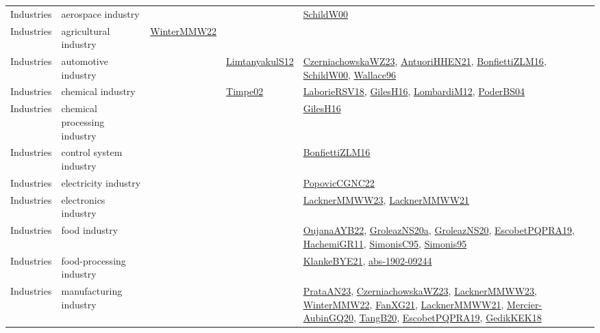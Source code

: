 {\begin{longtable}{lp{3cm}>{\raggedright}p{6cm}>{\raggedright}p{6cm}p{8cm}}
Industries & aerospace industry &  &  & \href{articles/SchildW00.pdf}{SchildW00}\cite{SchildW00}\\
Industries & agricultural industry & \href{papers/WinterMMW22.pdf}{WinterMMW22}\cite{WinterMMW22} &  & \\
Industries & automotive industry &  & \href{articles/LimtanyakulS12.pdf}{LimtanyakulS12}\cite{LimtanyakulS12} & \href{articles/CzerniachowskaWZ23.pdf}{CzerniachowskaWZ23}\cite{CzerniachowskaWZ23}, \href{papers/AntuoriHHEN21.pdf}{AntuoriHHEN21}\cite{AntuoriHHEN21}, \href{papers/BonfiettiZLM16.pdf}{BonfiettiZLM16}\cite{BonfiettiZLM16}, \href{articles/SchildW00.pdf}{SchildW00}\cite{SchildW00}, \href{articles/Wallace96.pdf}{Wallace96}\cite{Wallace96}\\
Industries & chemical industry &  & \href{articles/Timpe02.pdf}{Timpe02}\cite{Timpe02} & \href{articles/LaborieRSV18.pdf}{LaborieRSV18}\cite{LaborieRSV18}, \href{papers/GilesH16.pdf}{GilesH16}\cite{GilesH16}, \href{articles/LombardiM12.pdf}{LombardiM12}\cite{LombardiM12}, \href{articles/PoderBS04.pdf}{PoderBS04}\cite{PoderBS04}\\
Industries & chemical processing industry &  &  & \href{papers/GilesH16.pdf}{GilesH16}\cite{GilesH16}\\
Industries & control system industry &  &  & \href{papers/BonfiettiZLM16.pdf}{BonfiettiZLM16}\cite{BonfiettiZLM16}\\
Industries & electricity industry &  &  & \href{papers/PopovicCGNC22.pdf}{PopovicCGNC22}\cite{PopovicCGNC22}\\
Industries & electronics industry &  &  & \href{articles/LacknerMMWW23.pdf}{LacknerMMWW23}\cite{LacknerMMWW23}, \href{papers/LacknerMMWW21.pdf}{LacknerMMWW21}\cite{LacknerMMWW21}\\
Industries & food industry &  &  & \href{papers/OujanaAYB22.pdf}{OujanaAYB22}\cite{OujanaAYB22}, \href{papers/GroleazNS20a.pdf}{GroleazNS20a}\cite{GroleazNS20a}, \href{papers/GroleazNS20.pdf}{GroleazNS20}\cite{GroleazNS20}, \href{articles/EscobetPQPRA19.pdf}{EscobetPQPRA19}\cite{EscobetPQPRA19}, \href{articles/HachemiGR11.pdf}{HachemiGR11}\cite{HachemiGR11}, \href{papers/SimonisC95.pdf}{SimonisC95}\cite{SimonisC95}, \href{papers/Simonis95.pdf}{Simonis95}\cite{Simonis95}\\
Industries & food-processing industry &  &  & \href{papers/KlankeBYE21.pdf}{KlankeBYE21}\cite{KlankeBYE21}, \href{articles/abs-1902-09244.pdf}{abs-1902-09244}\cite{abs-1902-09244}\\
Industries & manufacturing industry &  &  & \href{articles/PrataAN23.pdf}{PrataAN23}\cite{PrataAN23}, \href{articles/CzerniachowskaWZ23.pdf}{CzerniachowskaWZ23}\cite{CzerniachowskaWZ23}, \href{articles/LacknerMMWW23.pdf}{LacknerMMWW23}\cite{LacknerMMWW23}, \href{papers/WinterMMW22.pdf}{WinterMMW22}\cite{WinterMMW22}, \href{articles/FanXG21.pdf}{FanXG21}\cite{FanXG21}, \href{papers/LacknerMMWW21.pdf}{LacknerMMWW21}\cite{LacknerMMWW21}, \href{papers/Mercier-AubinGQ20.pdf}{Mercier-AubinGQ20}\cite{Mercier-AubinGQ20}, \href{papers/TangB20.pdf}{TangB20}\cite{TangB20}, \href{articles/EscobetPQPRA19.pdf}{EscobetPQPRA19}\cite{EscobetPQPRA19}, \href{articles/GedikKEK18.pdf}{GedikKEK18}\cite{GedikKEK18}\\

\end{longtable}}
